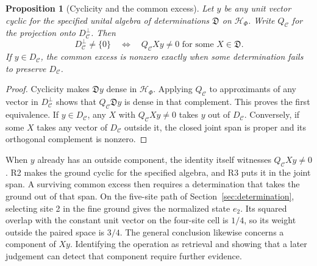 \documentclass[11pt]{article}
\newtheorem{proposition}{Proposition}[section]
\theoremstyle{definition}
\begin{document}
\begin{proposition}[Cyclicity and the common excess]\label{prop:cyclic-common-excess}
Let $y$ be any unit vector cyclic for the specified unital algebra of determinations $\mathfrak D$ on $\mathcal H_\Phi$. Write $Q_{\mathcal C}$ for the projection onto $D_{\mathcal C}^{\perp}$. Then
\[
 D_{\mathcal C}^{\perp}\ne\{0\}
 \quad\Longleftrightarrow\quad
 Q_{\mathcal C}Xy\ne0 \text{ for some } X\in\mathfrak D .
\]
If $y\in D_{\mathcal C}$, the common excess is nonzero exactly when some determination fails to preserve $D_{\mathcal C}$.
\end{proposition}
\begin{proof}
Cyclicity makes $\mathfrak D y$ dense in $\mathcal H_\Phi$. Applying $Q_{\mathcal C}$ to approximants of any vector in $D_{\mathcal C}^{\perp}$ shows that $Q_{\mathcal C}\mathfrak D y$ is dense in that complement. This proves the first equivalence. If $y\in D_{\mathcal C}$, any $X$ with $Q_{\mathcal C}Xy\ne0$ takes $y$ out of $D_{\mathcal C}$. Conversely, if some $X$ takes any vector of $D_{\mathcal C}$ outside it, the closed joint span is proper and its orthogonal complement is nonzero.
\end{proof}
When $y$ already has an outside component, the identity itself witnesses $Q_{\mathcal C}Xy\ne0$. R2 makes the ground cyclic for the specified algebra, and R3 puts it in the joint span. A surviving common excess then requires a determination that takes the ground out of that span. On the five-site path of Section~\ref{sec:determination}, selecting site 2 in the fine ground gives the normalized state $e_2$. Its squared overlap with the constant unit vector on the four-site cell is $1/4$, so its weight outside the paired space is $3/4$. The general conclusion likewise concerns a component of $Xy$. Identifying the operation as retrieval and showing that a later judgement can detect that component require further evidence.
\end{document}
